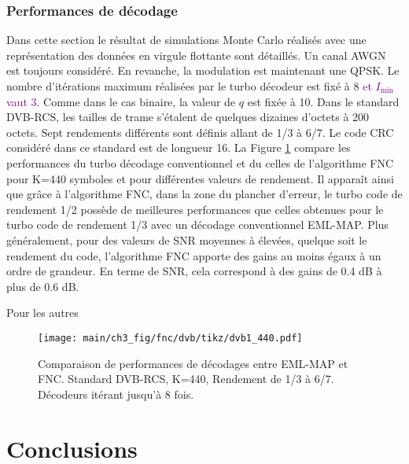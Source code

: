 \subsubsection{Performances de décodage}
Dans cette section le résultat de simulations Monte Carlo réalisés avec une représentation des données en virgule
flottante sont détaillés. Un canal AWGN est toujours considéré. En revanche, la modulation est maintenant une QPSK. Le 
nombre d'itérations maximum réalisées par le turbo décodeur est fixé à 8 \textcolor{purple}{et $I_{\text{min}}$ vaut 3}.
Comme dans le cas binaire, la valeur de $q$ est fixée à 10. Dans le standard DVB-RCS, les tailles de trame s'étalent 
de quelques dizaines d'octets à 200 octets. Sept rendements différents sont définis allant de 1/3 à 6/7. Le code CRC 
considéré dans ce standard est de longueur 16. La Figure \ref{fig:fnc_dvb1_440} compare les performances du turbo décodage
conventionnel et du celles de l'algorithme FNC pour K=440 symboles et pour différentes valeurs de rendement. Il apparaît 
ainsi que grâce à l'algorithme FNC, dans la zone du plancher d'erreur, le turbo code de rendement 1/2 possède de 
meilleures performances que celles obtenues pour le turbo code de rendement 1/3 avec un décodage conventionnel EML-MAP. 
Plus généralement, pour des valeurs de SNR moyennes à élevées, quelque soit le rendement du code, l'algorithme FNC apporte 
des gains au moins égaux à un ordre de grandeur. En terme de SNR, cela correspond à des gains de 0.4 dB à plus de 0.6 dB.

Pour les autres 

\begin{figure}[!htb]
	\centering
	\texttt{[image: main/ch3\_fig/fnc/dvb/tikz/dvb1\_440.pdf]}
	\caption{Comparaison de performances de décodages entre EML-MAP et FNC. Standard DVB-RCS, K=440, Rendement de 1/3 à 
	6/7.	Décodeurs itérant jusqu'à 8 fois. \label{fig:fnc_dvb1_440}}
\end{figure}

\newpage
\section{Conclusions}



